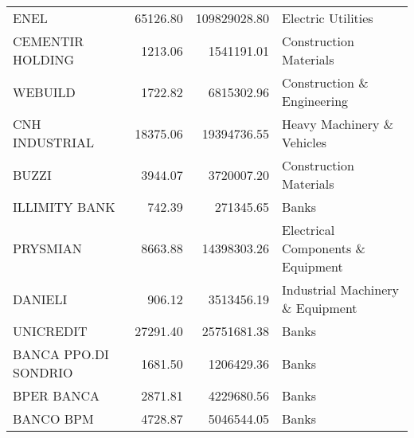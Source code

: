 \begin{tabular}{lrrl}
                  ENEL &    65126.80 & 109829028.80 &                                 Electric Utilities \\
      CEMENTIR HOLDING &     1213.06 &   1541191.01 &                             Construction Materials \\
               WEBUILD &     1722.82 &   6815302.96 &                         Construction \& Engineering \\
        CNH INDUSTRIAL &    18375.06 &  19394736.55 &                         Heavy Machinery \& Vehicles \\
                 BUZZI &     3944.07 &   3720007.20 &                             Construction Materials \\
         ILLIMITY BANK &      742.39 &    271345.65 &                                              Banks \\
              PRYSMIAN &     8663.88 &  14398303.26 &                  Electrical Components \& Equipment \\
               DANIELI &      906.12 &   3513456.19 &                   Industrial Machinery \& Equipment \\
             UNICREDIT &    27291.40 &  25751681.38 &                                              Banks \\
  BANCA PPO.DI SONDRIO &     1681.50 &   1206429.36 &                                              Banks \\
            BPER BANCA &     2871.81 &   4229680.56 &                                              Banks \\
             BANCO BPM &     4728.87 &   5046544.05 &                                              Banks \\
\bottomrule
\end{tabular}
